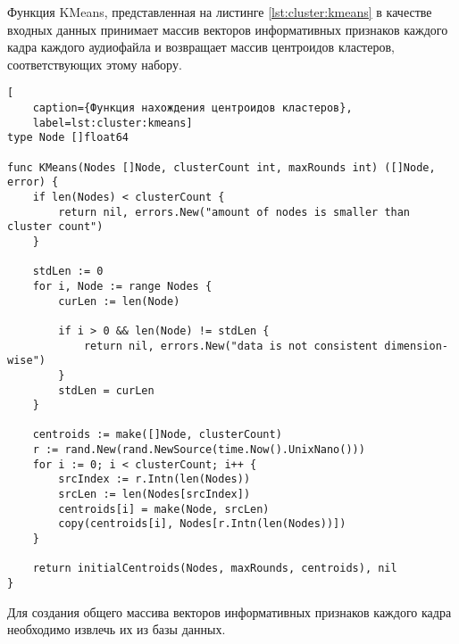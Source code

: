 Функция KMeans, представленная на листинге \ref{lst:cluster:kmeans} в качестве входных данных принимает массив векторов информативных признаков каждого кадра каждого аудиофайла и возвращает массив центроидов кластеров, соответствующих этому набору.
\begin{lstlisting}[
	caption={Функция нахождения центроидов кластеров},
	label=lst:cluster:kmeans]
type Node []float64

func KMeans(Nodes []Node, clusterCount int, maxRounds int) ([]Node, error) {
    if len(Nodes) < clusterCount {
        return nil, errors.New("amount of nodes is smaller than cluster count")
    }

    stdLen := 0
    for i, Node := range Nodes {
        curLen := len(Node)

        if i > 0 && len(Node) != stdLen {
            return nil, errors.New("data is not consistent dimension-wise")
        }
        stdLen = curLen
    }

    centroids := make([]Node, clusterCount)
    r := rand.New(rand.NewSource(time.Now().UnixNano()))
    for i := 0; i < clusterCount; i++ {
        srcIndex := r.Intn(len(Nodes))
        srcLen := len(Nodes[srcIndex])
        centroids[i] = make(Node, srcLen)
        copy(centroids[i], Nodes[r.Intn(len(Nodes))])
    }

    return initialCentroids(Nodes, maxRounds, centroids), nil
}
\end{lstlisting}
Для создания общего массива векторов информативных признаков каждого кадра необходимо извлечь их из базы данных. 


